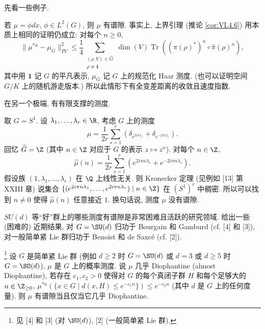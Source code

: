 先看一些例子.

\begin{example}[$L^2$ 密度有谱隙]
\label{exa:VI.6.3.3}
若 $\mu = \phi dx$, $\phi \in L^2(G)$, 则 $\mu$ 有谱隙. 事实上, 上界引理 (推论 \ref{cor:VI.4.6}) 用本质上相同的证明仍成立: 对每个 $n \geq 0$,
\[
\|\mu^{*n} - \mu_G\|_{TV}^2 \leq \frac{1}{4}\sum_{\substack{(\rho, V) \in \widehat{G}\\ \rho \not\simeq \mathbf{1}}}\dim(V)\operatorname{Tr}((\hat{\pi}(\rho)^*)^n \circ \hat{\pi}(\rho)^n),
\]
其中用 $\mathbf{1}$ 记 $G$ 的平凡表示, $\mu_G$ 记 $G$ 上的规范化 Haar 测度. (也可以证明空间 $G/K$ 上的随机游走版本.) 所以此情形下有全变差距离的收敛且速度指数.
\end{example}

在另一个极端, 有有限支撑的测度.

\begin{example}[无谱隙的测度]
\label{exa:VI.6.3.4}
取 $G = S^1$. 设 $\lambda_1, \ldots, \lambda_r \in \R$, 考虑 $G$ 上的测度
\[
\mu = \frac{1}{2r}\sum_{s=1}^r(\delta_{e^{2i\pi\lambda_s}} + \delta_{e^{-2i\pi\lambda_s}}).
\]
回忆 $\widehat{G} = \Z$ (其中 $n \in \Z$ 对应于 $G$ 的表示 $z \longmapsto z^n$). 对每个 $n \in \Z$,
\[
\hat{\mu}(n) = \frac{1}{2r}\sum_{s=1}^r(e^{2i\pi n\lambda_s} + e^{-2i\pi n\lambda_s}).
\]
假设族 $(1, \lambda_1, \ldots, \lambda_r)$ 在 $\Q$ 上线性无关. 则 Kronecker 定理 (见例如 {[}13{]} 第 XXIII 章) 说集合 $\{(e^{2i\pi n\lambda_1}, \ldots, e^{2i\pi n\lambda_r}) \mid n \in \Z\}$ 在 $(S^1)^r$ 中稠密. 所以可以找到 $n \neq 0$ 使得 $\hat{\mu}(n)$ 任意接近 $1$. 换句话说, 测度 $\mu$ 没有谱隙.
\end{example}

$SU(d)$ 等``好''群上的哪些测度有谱隙是非常困难且活跃的研究领域. 给出一些 (困难的) 近期结果, 对 $G = \SU(d)$ 归功于 Bourgain 和 Gamburd (cf. {[}4{]} 和 {[}3{]}), 对一般简单紧 Lie 群归功于 Benoist 和 de Saxc\'e (cf. {[}2{]}).

\begin{theorem}[谱隙判据]\footnote{见 {[}4{]} 和 {[}3{]} (对 $\SU(d)$), {[}2{]} (一般简单紧 Lie 群).}
\label{thm:VI.6.3.5}
设 $G$ 是简单紧 Lie 群 (例如 $d \geq 2$ 时 $G = \SU(d)$ 或 $d = 3$ 或 $d \geq 5$ 时 $G = \SO(d)$), $\mu$ 是 $G$ 上的概率测度. 说 $\mu$ 几乎 Diophantine (almost Diophantine), 若存在 $c_1, c_2 > 0$ 使得对 $G$ 的每个真闭子群 $H$ 和每个足够大的 $n \in \Z_{\geq 0}$, $\mu^{*n}(\{x \in G \mid d(x, H) \leq e^{-c_1n}\}) \leq e^{-c_2n}$ (其中 $d$ 是 $G$ 上的任何度量).
则 $\mu$ 有谱隙当且仅当它几乎 Diophantine.
\end{theorem}

